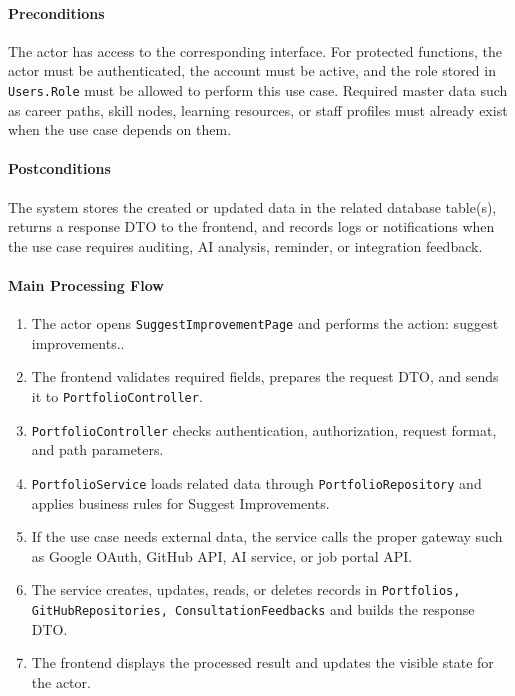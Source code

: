 \paragraph{Preconditions}

The actor has access to the corresponding interface. For protected functions, the actor must be authenticated, the account must be active, and the role stored in \texttt{Users.Role} must be allowed to perform this use case. Required master data such as career paths, skill nodes, learning resources, or staff profiles must already exist when the use case depends on them.

\paragraph{Postconditions}

The system stores the created or updated data in the related database table(s), returns a response DTO to the frontend, and records logs or notifications when the use case requires auditing, AI analysis, reminder, or integration feedback.

\paragraph{Main Processing Flow}

\begin{enumerate}
    \item The actor opens \texttt{SuggestImprovementPage} and performs the action: suggest improvements..
    \item The frontend validates required fields, prepares the request DTO, and sends it to \texttt{PortfolioController}.
    \item \texttt{PortfolioController} checks authentication, authorization, request format, and path parameters.
    \item \texttt{PortfolioService} loads related data through \texttt{PortfolioRepository} and applies business rules for Suggest Improvements.
    \item If the use case needs external data, the service calls the proper gateway such as Google OAuth, GitHub API, AI service, or job portal API.
    \item The service creates, updates, reads, or deletes records in \texttt{Portfolios, GitHubRepositories, ConsultationFeedbacks} and builds the response DTO.
    \item The frontend displays the processed result and updates the visible state for the actor.
\end{enumerate}

